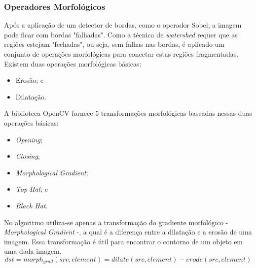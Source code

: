    

\subsubsection{Operadores Morfológicos}
Após a aplicação de um detector de bordas, como o operador Sobel, a imagem pode ficar com bordas "falhadas". Como a técnica de \textit{watershed} requer que as regiões estejam "fechadas", ou seja, sem falhas nas bordas, é aplicado um conjunto de operações morfológicas para conectar estas regiões fragmentadas. 
Existem duas operações morfológicas básicas:
\begin{itemize}
    \item Erosão; e
    \item Dilatação.
\end{itemize}    

A biblioteca OpenCV fornece 5 transformações morfológicas baseadas nessas duas operações básicas:
\begin{itemize}
    \item \textit{Opening};
    \item \textit{Closing};
    \item \textit{Morphological Gradient};
    \item \textit{Top Hat}; e 
    \item \textit{Black Hat}.
\end{itemize} 

No algoritmo utiliza-se apenas a transformação do gradiente morfológico - \textit{Morphological Gradient} -, a qual é a diferença entre a dilatação e a erosão de uma imagem. Essa transformação é útil para encontrar o contorno de um objeto em uma dada imagem. \citep{morphology_transformations}
\[dst = morph_{grad}( src, element ) = dilate( src, element ) - erode( src, element )\]

